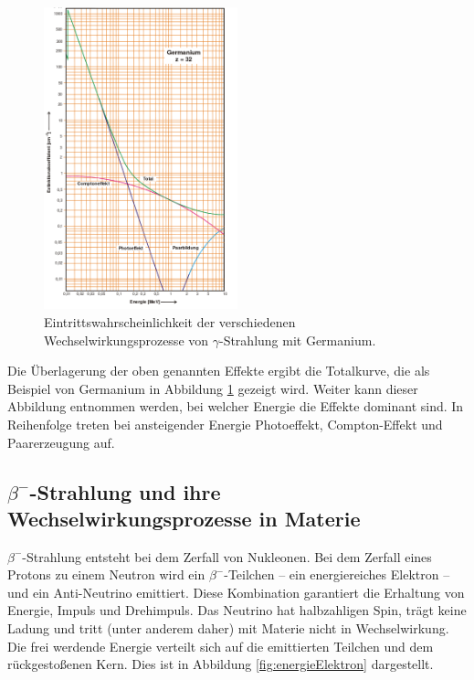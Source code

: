 \begin{figure}
	\centering
	\includegraphics[width=0.5\textwidth]{Bilder/germanium.png}
	\caption{Eintrittswahrscheinlichkeit der verschiedenen Wechselwirkungsprozesse von \texorpdfstring{$\gamma$}{Gamma}-Strahlung mit Germanium.\cite{skript}}
	\label{fig:Germanium}
\end{figure}
Die Überlagerung der oben genannten Effekte ergibt die Totalkurve, die als Beispiel von Germanium in Abbildung \ref{fig:Germanium} gezeigt wird.
Weiter kann dieser Abbildung entnommen werden, bei welcher Energie die Effekte dominant sind.
In Reihenfolge treten bei ansteigender Energie Photoeffekt, Compton-Effekt und Paarerzeugung auf.


\subsection{\texorpdfstring{$\beta^-$}{Beta}-Strahlung und ihre Wechselwirkungsprozesse in Materie}
\label{sec:beta}

$\beta^-$-Strahlung entsteht bei dem Zerfall von Nukleonen.
Bei dem Zerfall eines Protons zu einem Neutron wird ein $\beta^-$-Teilchen -- ein energiereiches Elektron -- und ein Anti-Neutrino emittiert.
Diese Kombination garantiert die Erhaltung von Energie, Impuls und Drehimpuls.
Das Neutrino hat halbzahligen Spin, trägt keine Ladung und tritt (unter anderem daher) mit Materie nicht in Wechselwirkung.
Die frei werdende Energie verteilt sich auf die emittierten Teilchen und dem rückgestoßenen Kern.
Dies ist in Abbildung \ref{fig:energieElektron} dargestellt.

